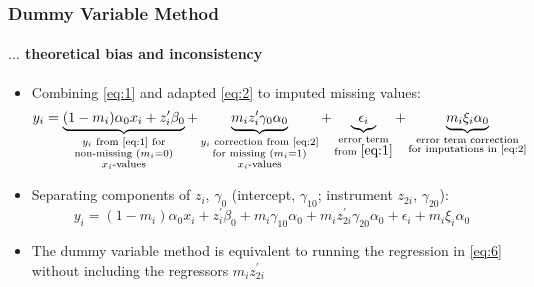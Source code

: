 \documentclass[aspectratio=1610]{beamer}
\begin{document}
\begin{frame}
	\frametitle{Dummy Variable Method}
	\framesubtitle{$\ldots$ theoretical bias and inconsistency}
	\begin{itemize}
		\item<1-> Combining \eqref{eq:1} and adapted \eqref{eq:2} to imputed missing values:
		\begin{equation}\label{eq:4}
            y_i = \underbrace{(1-m_i) \alpha_0 x_i + z_i^{\prime} \beta_0}_{\substack{
				y_i \text{ from \eqref{eq:1} for}\\
				\text{non-missing } (m_i = 0)\\
				x_i \text{-values}}} +
				\underbrace{m_i z_i^{\prime} \gamma_0 \alpha_0}_{\substack{
					y_i \text{ correction from \eqref{eq:2}}\\
					\text{for missing } (m_i = 1)\\
					x_i \text{-values}}} +
				\underbrace{\epsilon_i}_{\substack{
					\text{error term}\\
					\text{from } \eqref{eq:1}}} +
				\underbrace{m_i \xi_i \alpha_0}_{\substack{
					\text{error term correction}\\
					\text{for imputations in \eqref{eq:2}}}}
		\end{equation}

		\item<2-> Separating components of $z_i$, $\gamma_0$ (intercept, $\gamma_{10}$; instrument $z_{2i}$, $\gamma_{20}$):
		\begin{equation}\label{eq:6}
			y_i = (1-m_i) \alpha_0 x_i + z_i^{\prime} \beta_0 + m_i \gamma_{10} \alpha_0 + m_i z_{2i}^{\prime} \gamma_{20} \alpha_0 + \epsilon_i + m_i \xi_i \alpha_0
		\end{equation}
		\item<3-> The dummy variable method is equivalent to running the regression in \eqref{eq:6} without including the regressors $m_i z_{2i}^{\prime}$
	\end{itemize}
\end{frame}
\end{document}
